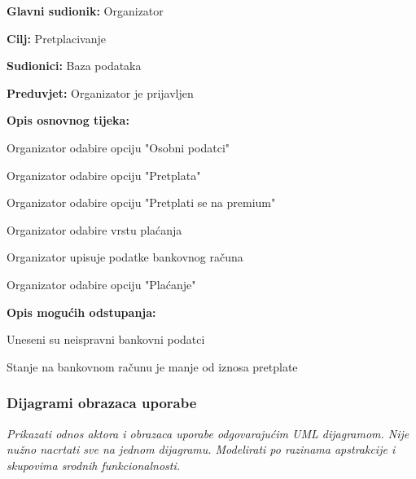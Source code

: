 					\noindent {}
					\begin{packed_item}
	
						\item \textbf{Glavni sudionik: }Organizator
						\item  \textbf{Cilj:} Pretplacivanje
						\item  \textbf{Sudionici:} Baza podataka
						\item  \textbf{Preduvjet:} Organizator je prijavljen
						\item  \textbf{Opis osnovnog tijeka:}
						
						\item[] \begin{packed_enum}
	
							\item Organizator odabire opciju "Osobni podatci"
							\item Organizator odabire opciju "Pretplata"
							\item Organizator odabire opciju "Pretplati se na premium"
							\item Organizator odabire vrstu plaćanja
							\item Organizator upisuje podatke bankovnog računa
							\item Organizator odabire opciju "Plaćanje"
						\end{packed_enum}
						
						\item  \textbf{Opis mogućih odstupanja:}
						
						\item[] \begin{packed_item}
	
							\item[5.a] Uneseni su neispravni bankovni podatci
							\item[6.a] Stanje na bankovnom računu je manje od iznosa pretplate

							
						\end{packed_item}
					\end{packed_item}
				
					
				\subsubsection{Dijagrami obrazaca uporabe}
					
					\textit{Prikazati odnos aktora i obrazaca uporabe odgovarajućim UML dijagramom. Nije nužno nacrtati sve na jednom dijagramu. Modelirati po razinama apstrakcije i skupovima srodnih funkcionalnosti.}
				\eject		
				
